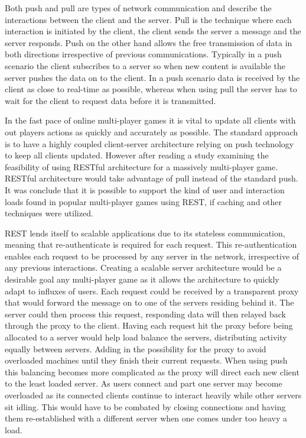 Both push and pull are types of network communication and describe the interactions between the client and the server. Pull is the technique where each interaction is initiated by the client, the client sends the server a message and the server responds. Push on the other hand allows the free transmission of data in both directions irrespective of previous communications. Typically in a push scenario the client subscribes to a server so when new content is available the server pushes the data on to the client. In a push scenario data is received by the client as close to real-time as possible, whereas when using pull the server has to wait for the client to request data before it is transmitted.

In the fast pace of online multi-player games it is vital to update all clients with out players actions as quickly and accurately as possible. The standard approach is to have a highly coupled client-server architecture relying on push technology to keep all clients updated. However after reading a study\cite{6329833} examining the feasibility of using RESTful architecture for a massively multi-player game. RESTful architecture would take advantage of pull instead of the standard push. It was conclude that it is possible to support the kind of user and interaction loads found in popular multi-player games using REST, if caching and other techniques were utilized.

REST lends itself to scalable applications due to its stateless communication, meaning that re-authenticate is required for each request. This re-authentication enables each request to be processed by any server in the network, irrespective of any previous interactions. Creating a scalable server architecture would be a desirable goal any multi-player game as it allows the architecture to quickly adapt to influxes of users. Each request could be received by a transparent proxy that would forward the message on to one of the servers residing behind it. The server could then process this request, responding data will then relayed back through the proxy to the client. Having each request hit the proxy before being allocated to a server would help load balance the servers, distributing activity equally between servers. Adding in the possibility for the proxy to avoid overloaded machines until they finish their current requests. When using push this balancing becomes more complicated as the proxy will direct each new client to the least loaded server. As users connect and part one server may become overloaded as its connected clients continue to interact heavily while other servers sit idling. This would have to be combated by closing connections and having them re-established with a different server when one comes under too heavy a load.

